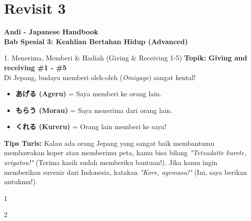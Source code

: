 ﻿\chapter{Revisit 3}

\begin{center}
    {\Huge \bfseries Andi - Japanese Handbook}\\[0.5em]
    {\LARGE \color{boxframe} \textbf{Bab Spesial 3: Keahlian Bertahan Hidup (Advanced)}}
\end{center}
\vspace{1em}

\begin{lessonbox}{1. Menerima, Memberi \& Hadiah (Giving \& Receiving 1-5)}
    \textbf{Topik: Giving and receiving \#1 - \#5} \\
    Di Jepang, budaya memberi oleh-oleh (\textit{Omiyage}) sangat kental! 
    \begin{itemize}
        \item \textbf{あげる (Ageru)} = Saya memberi ke orang lain.
        \item \textbf{もらう (Morau)} = Saya menerima dari orang lain.
        \item \textbf{くれる (Kureru)} = Orang lain memberi ke saya!
    \end{itemize}
    \textbf{Tips Turis:} Kalau ada orang Jepang yang sangat baik membantumu membawakan koper atau memberimu peta, kamu bisa bilang \textit{"Tetsudatte kurete, arigatou!"} (Terima kasih sudah memberiku bantuan!). Jika kamu ingin memberikan suvenir dari Indonesia, katakan \textit{"Kore, agemasu!"} (Ini, saya berikan untukmu!).
\end{lessonbox}

\begin{convobox}{1}
    \noindent
      
      

    \vspace{1.5em}
\end{convobox}

\begin{convobox}{2}
    \noindent

    \vspace{1.5em}
\end{convobox}

